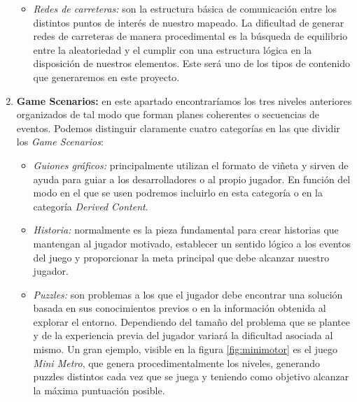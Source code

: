\begin{enumerate}[label=(\alph*)]
\begin{itemize}
        \item \textit{Redes de carreteras:} son la estructura básica de comunicación entre los distintos puntos de interés de nuestro mapeado. La dificultad de generar redes de carreteras de manera procedimental es la búsqueda de equilibrio entre la aleatoriedad y el cumplir con una estructura lógica en la disposición de nuestros elementos. Este será uno de los tipos de contenido que generaremos en este proyecto.
    \end{itemize}
    
    \item \textbf{Game Scenarios:} en este apartado encontraríamos los tres niveles anteriores organizados de tal modo que forman planes coherentes o secuencias de eventos. Podemos distinguir claramente cuatro categorías en las que dividir los \textit{Game Scenarios}:
    
    \begin{itemize}
        \item \textit{Guiones gráficos:} principalmente utilizan el formato de viñeta y sirven de ayuda para guiar a los desarrolladores o al propio jugador. En función del modo en el que se usen podremos incluirlo en esta categoría o en la categoría \textit{Derived Content}.
        \item \textit{Historia:} normalmente es la pieza fundamental para crear historias que mantengan al jugador motivado, establecer un sentido lógico a los eventos del juego y proporcionar la meta principal que debe alcanzar nuestro jugador.
        \item \textit{Puzzles:} son problemas a los que el jugador debe encontrar una solución basada en sus conocimientos previos o en la información obtenida al explorar el entorno. Dependiendo del tamaño del problema que se plantee y de la experiencia previa del jugador variará la dificultad asociada al mismo. Un gran ejemplo, visible en la figura \ref{fig:minimotor} es el juego \textit{Mini Metro}, que genera procedimentalmente los niveles, generando puzzles distintos cada vez que se juega y teniendo como objetivo alcanzar la máxima puntuación posible.
        

\end{itemize}
\end{enumerate}
